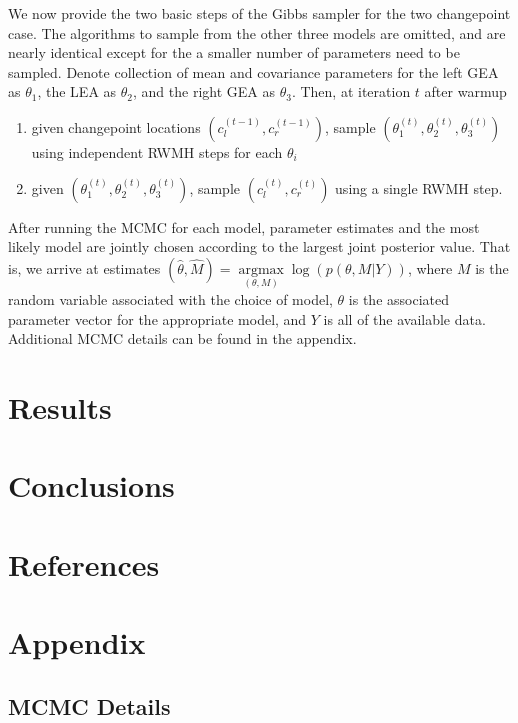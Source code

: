 \documentclass[12pt]{article}
\providecommand{\tightlist}{%
  \setlength{\itemsep}{0pt}\setlength{\parskip}{0pt}}
\begin{document}
We now provide the two basic steps of the Gibbs sampler for the two
changepoint case. The algorithms to sample from the other three models
are omitted, and are nearly identical except for the a smaller number of
parameters need to be sampled. Denote collection of mean and covariance
parameters for the left GEA as \(\theta_1\), the LEA as \(\theta_2\),
and the right GEA as \(\theta_3\). Then, at iteration \(t\) after warmup

\begin{enumerate}
\def\labelenumi{\arabic{enumi}.}
\tightlist
\item
  given changepoint locations \((c_l^{(t - 1)}, c_r^{(t - 1)})\), sample
  \((\theta_1^{(t)}, \theta_2^{(t)}, \theta_3^{(t)})\) using independent
  RWMH steps for each \(\theta_i\)\\
\item
  given \((\theta_1^{(t)}, \theta_2^{(t)}, \theta_3^{(t)})\), sample
  \((c_l^{(t)}, c_r^{(t)})\) using a single RWMH step.
\end{enumerate}

After running the MCMC for each model, parameter estimates and the most
likely model are jointly chosen according to the largest joint posterior
value. That is, we arrive at estimates
\((\hat{\theta}, \hat{M}) = \underset{(\theta, M)}{\operatorname{argmax}}{\log(p(\theta, M | Y))}\),
where \(M\) is the random variable associated with the choice of model,
\(\theta\) is the associated parameter vector for the appropriate model,
and \(Y\) is all of the available data. Additional MCMC details can be
found in the appendix.

\section{Results}

\section{Conclusions}

\section{References}

\section{Appendix}

\subsection{MCMC Details}
\end{document}
